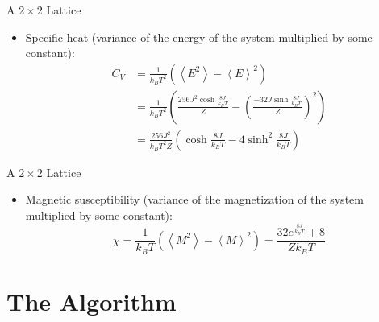 \documentclass{beamer} %
\begin{document}
\begin{frame}{A $2\times2$ Lattice}
\begin{itemize}
\item Specific heat (variance of the energy of the system multiplied by some constant):
\begin{align}
\label{eq:cvdef}
C_{V} &= \frac{1}{k_{B}T^{2}}\left(\left<E^{2}\right>-\left<E\right>^{2}\right) \\ \nonumber
& = \frac{1}{k_{B}T^{2}}\left(\frac{256J^{2}\cosh{\frac{8J}{k_{B}T}}}{Z}-\left(\frac{-32J\sinh{\frac{8J}{k_{B}T}}}{Z}\right)^{2}\right) \\ \nonumber 
& =\frac{256J^{2}}{k_{B}T^{2}Z}\left(\cosh{\frac{8J}{k_{B}T}}-4\sinh^{2}{\frac{8J}{k_{B}T}}\right)
\end{align}
\end{itemize}
\end{frame}

\begin{frame}{A $2\times2$ Lattice}
\begin{itemize}
\item Magnetic susceptibility (variance of the magnetization of the system multiplied by some constant):
\begin{equation}
\label{eq:chidef}
\chi = \frac{1}{k_{B}T}\left(\left<M^{2}\right>-\left<M\right>^{2}\right) = \frac{32e^{\frac{8J}{k_{B}T}}+8}{Zk_{B}T}
\end{equation}
\end{itemize}
\end{frame}

\section{The Algorithm}
\end{document}
